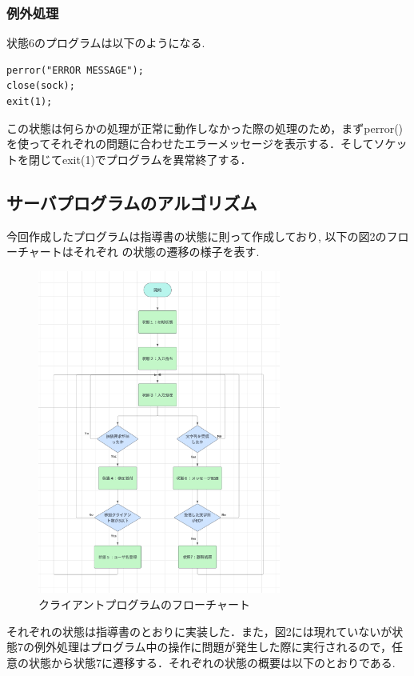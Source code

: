 \documentclass[dvipdfmx]{jarticle}
\begin{document}
\subsubsection{例外処理}
状態6のプログラムは以下のようになる.
\begin{lstlisting}
perror("ERROR MESSAGE");
close(sock);
exit(1);
\end{lstlisting}
この状態は何らかの処理が正常に動作しなかった際の処理のため，まずperror()を使ってそれぞれの問題に合わせたエラーメッセージを表示する．そしてソケットを閉じてexit(1)でプログラムを異常終了する．
\subsection{サーバプログラムのアルゴリズム}
今回作成したプログラムは指導書の状態に則って作成しており, 以下の図2のフローチャートはそれぞれ
の状態の遷移の様子を表す.
\clearpage
\begin{figure}[h]
    \centering
    \includegraphics[width=8cm]{4-1serverhurotya.png}
    \caption{クライアントプログラムのフローチャート}
\end{figure}
それぞれの状態は指導書のとおりに実装した．また，図2には現れていないが状態7の例外処理はプログラム中の操作に問題が発生した際に実行されるので，任意の状態から状態7に遷移する．それぞれの状態の概要は以下のとおりである.
\end{document}
